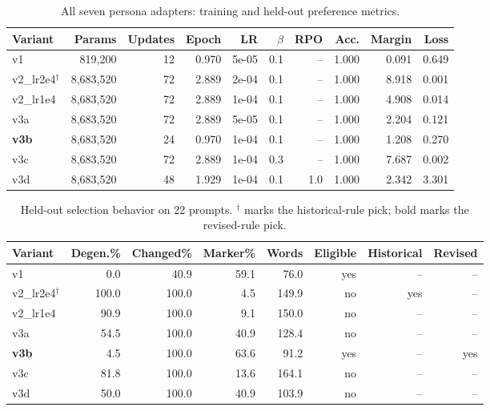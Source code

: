 \begin{table}[H]\centering\footnotesize\caption{All seven persona adapters: training and held-out preference metrics.}\label{tab:persona-all}\setlength{\tabcolsep}{3pt}\begin{tabular}{lrrrrrrrrr}\toprule Variant&Params&Updates&Epoch&LR&$\beta$&RPO&Acc.&Margin&Loss\\\midrule
v1&819,200&12&0.970&5e-05&0.1&--&1.000&0.091&0.649\\
v2\_lr2e4$^\dagger$&8,683,520&72&2.889&2e-04&0.1&--&1.000&8.918&0.001\\
v2\_lr1e4&8,683,520&72&2.889&1e-04&0.1&--&1.000&4.908&0.014\\
v3a&8,683,520&72&2.889&5e-05&0.1&--&1.000&2.204&0.121\\
\textbf{v3b}&8,683,520&24&0.970&1e-04&0.1&--&1.000&1.208&0.270\\
v3c&8,683,520&72&2.889&1e-04&0.3&--&1.000&7.687&0.002\\
v3d&8,683,520&48&1.929&1e-04&0.1&1.0&1.000&2.342&3.301\\
\bottomrule\end{tabular}\end{table}
\begin{table}[H]\centering\footnotesize\caption{Held-out selection behavior on 22 prompts. $^\dagger$ marks the historical-rule pick; bold marks the revised-rule pick.}\label{tab:persona-held}\begin{tabular}{lrrrrrrr}\toprule Variant&Degen.\%&Changed\%&Marker\%&Words&Eligible&Historical&Revised\\\midrule
v1&0.0&40.9&59.1&76.0&yes&--&--\\
v2\_lr2e4$^\dagger$&100.0&100.0&4.5&149.9&no&yes&--\\
v2\_lr1e4&90.9&100.0&9.1&150.0&no&--&--\\
v3a&54.5&100.0&40.9&128.4&no&--&--\\
\textbf{v3b}&4.5&100.0&63.6&91.2&yes&--&yes\\
v3c&81.8&100.0&13.6&164.1&no&--&--\\
v3d&50.0&100.0&40.9&103.9&no&--&--\\
\bottomrule\end{tabular}\end{table}

